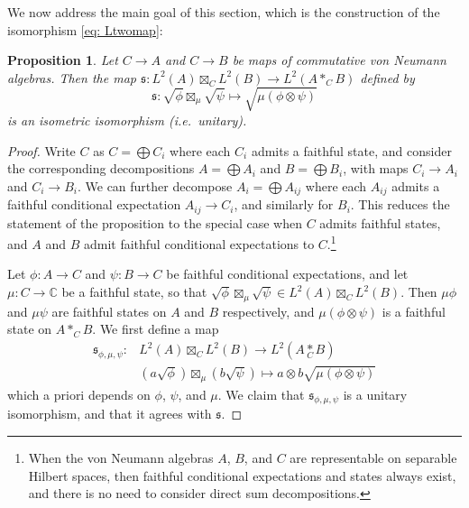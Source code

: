 \documentclass[10pt,a4paper,oneside]{amsart}
\newtheorem{proposition}[theorem]{Proposition}
\theoremstyle{remark}
\theoremstyle{definition}
\newcommand{\rar}{\rightarrow}
\newcommand{\cofu}[1]{\mathop{\boxtimes}_{#1}}
\newcommand{\tens}[1]{\mathop{*}\limits_{#1}}
\newcommand{\Ltwomap}{\mathfrak{s}}
\begin{document}
We now address the main goal of this section, which is the construction of the isomorphism \eqref{eq: Ltwomap}:

\begin{proposition}\label{prop:tensstandard}
Let $C\rar A$ and $C\rar B$ be maps of commutative von Neumann algebras. Then the map $\Ltwomap\colon 	L^2(A)\cofu{C}L^2(B) \rar  L^2(A\ast_{C}B)$ defined by
	$$
	\Ltwomap\colon 	\sqrt{\phi} \cofu{\mu}\sqrt{\psi} \mapsto 	\sqrt{\mu (\phi \otimes \psi)}
	$$
	is an isometric isomorphism (i.e.~unitary).
\end{proposition}

\begin{proof}
Write $C$ as $C=\bigoplus C_i$ where each $C_i$ admits a faithful state, and consider the corresponding decompositions $A=\bigoplus A_i$ and $B=\bigoplus B_i$, with maps $C_i \rar A_i$ and $C_i \rar B_i$. We can further decompose $A_i=\bigoplus A_{ij}$ where each $A_{ij}$ admits a faithful conditional expectation $A_{ij} \rar C_i$, and similarly for $B_i$.
This reduces the statement of the proposition to the special case when $C$ admits faithful states, and $A$ and $B$ admit faithful conditional expectations to $C$.\footnote{When the von Neumann algebras $A$, $B$, and $C$ are representable on separable Hilbert spaces, then faithful conditional expectations and states always exist, and there is no need to consider direct sum decompositions.}

Let $\phi:A\to C$ and $\psi:B\to C$ be faithful conditional expectations, and let $\mu:C\to \mathbb C$ be a faithful state, so that
$\sqrt{\phi} \cofu{\mu}\sqrt{\psi}\in L^2(A)\cofu{C}L^2(B)$. Then $\mu \phi$ and $\mu \psi$ are faithful states on $A$ and $B$ respectively, and $\mu(\phi \otimes\psi)$ is a faithful state on $A \ast_{ C} B$.
We first define a map
\begin{align*}
     \Ltwomap_{\phi,\mu,\psi}\colon& L^2(A)\cofu{C}L^2(B) \rar  L^2(A\tens{C}B)\\
    & (a\sqrt{\phi})\cofu{\mu}(b\sqrt{\psi})\mapsto a\otimes b \sqrt{\mu (\phi \otimes \psi)}
\end{align*}
which a priori depends on $\phi$, $\psi$, and $\mu$.
We claim that $\Ltwomap_{\phi,\mu,\psi}$ is a unitary isomorphism, and that it agrees with $\Ltwomap$.


\end{proof}
\end{document}
